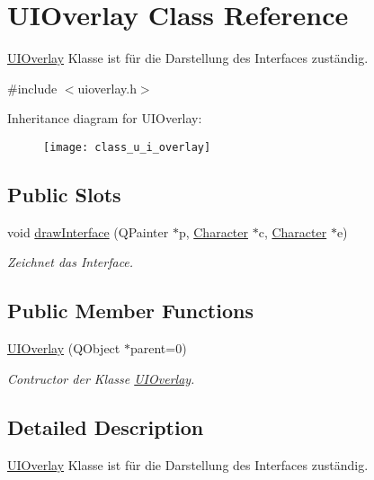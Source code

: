 \hypertarget{class_u_i_overlay}{}\section{U\+I\+Overlay Class Reference}
\label{class_u_i_overlay}


\hyperlink{class_u_i_overlay}{U\+I\+Overlay} Klasse ist für die Darstellung des Interfaces zuständig.  




{\ttfamily \#include $<$uioverlay.\+h$>$}

Inheritance diagram for U\+I\+Overlay\+:\begin{figure}[H]
\begin{center}
\leavevmode
\texttt{[image: class\_u\_i\_overlay]}
\end{center}
\end{figure}
\subsection*{Public Slots}
\begin{DoxyCompactItemize}
\item 
void \hyperlink{class_u_i_overlay_a9b3960185a836ecb504ce25d22c1893e}{draw\+Interface} (Q\+Painter $\ast$p, \hyperlink{class_character}{Character} $\ast$c, \hyperlink{class_character}{Character} $\ast$e)
\begin{DoxyCompactList}\small\item\em Zeichnet das Interface. \end{DoxyCompactList}\end{DoxyCompactItemize}
\subsection*{Public Member Functions}
\begin{DoxyCompactItemize}
\item 
\hyperlink{class_u_i_overlay_a51696f81d4333f2c7537a103d9440c47}{U\+I\+Overlay} (Q\+Object $\ast$parent=0)
\begin{DoxyCompactList}\small\item\em Contructor der Klasse \hyperlink{class_u_i_overlay}{U\+I\+Overlay}. \end{DoxyCompactList}\end{DoxyCompactItemize}


\subsection{Detailed Description}
\hyperlink{class_u_i_overlay}{U\+I\+Overlay} Klasse ist für die Darstellung des Interfaces zuständig. 

